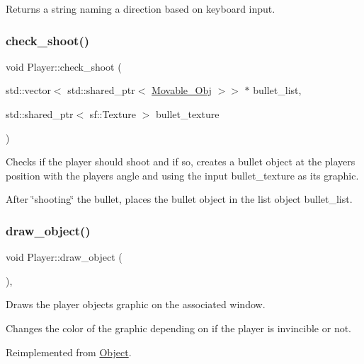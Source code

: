 Returns a string naming a direction based on keyboard input. \mbox{\label{classPlayer_acaadb9db9181983bc036ded7f932a65e}} 
\subsubsection{\texorpdfstring{check\+\_\+shoot()}{check\_shoot()}}
{\footnotesize\ttfamily void Player\+::check\+\_\+shoot (\begin{DoxyParamCaption}\item[{std\+::vector$<$ std\+::shared\+\_\+ptr$<$ \hyperlink{classMovable__Obj}{Movable\+\_\+\+Obj} $>$$>$ $\ast$}]{bullet\+\_\+list,  }\item[{std\+::shared\+\_\+ptr$<$ sf\+::\+Texture $>$}]{bullet\+\_\+texture }\end{DoxyParamCaption})}

Checks if the player should shoot and if so, creates a bullet object at the players position with the players angle and using the input bullet\+\_\+texture as its graphic.

After \char`\"{}shooting\char`\"{} the bullet, places the bullet object in the list object bullet\+\_\+list. \mbox{\label{classPlayer_a18996f72627e846529e741e4f8efb3dd}} 
\subsubsection{\texorpdfstring{draw\+\_\+object()}{draw\_object()}}
{\footnotesize\ttfamily void Player\+::draw\+\_\+object (\begin{DoxyParamCaption}{ }\end{DoxyParamCaption})\hspace{0.3cm}{\ttfamily [override]}, {\ttfamily [virtual]}}

Draws the player objects graphic on the associated window.

Changes the color of the graphic depending on if the player is invincible or not. 

Reimplemented from \hyperlink{classObject_a87b1a93e287279985c45941c3e78fed4}{Object}.

\mbox{\label{classPlayer_aedcb14b7e42d95d6b1fdb7dd6879dd2b}} 
